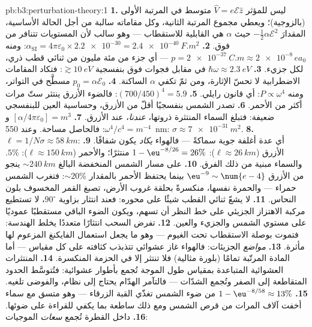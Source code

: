 \begin{solution}{pb:b3:perturbation-theory:1}
\textbf{1.} ليس للمؤثر $\hat V = e\mathcal E\hat z$ متوسط في المرتبة الأولى
(بالزوجية)؛ ويعطي مجموع المرتبة الثانية، وكل مقاماته سالبة من أجل
الحالة الأساسية، المقدارَ $-\tfrac12\alpha\mathcal E^2$ حيث $\alpha$ هي
القابلية للاستقطاب --- وهو سالب لأن المستويات تتنافر من فوق.
\textbf{2.} $\alpha_{\text{SI}} = 4\pi\varepsilon_0 \times
\num{2.2e-30} = \qty{2.4e-40}{F.m^2}$: ومنه $p = \qty{2e-37}{C.m}
\approx \num{2e-8}\,ea_0$ --- أي جزء من مئة مليون من ثنائي قطب
ذري، لكل جزيء.
\textbf{3.} $\hbar\omega \approx \qty{2.3}{eV}$ في مقابل فجوات
فوق بنفسجية $\gtrsim\qty{10}{eV}$: فتكاد المقامات الاضطرابية
لا تحسّ الإثارة، ومن ثمّ تكفي $\alpha$ الساكنة.
\textbf{4.} $p_0 = \alpha\mathcal E_0$ مسطَّح في التواتر، ومنه $P
\propto \omega^4$: أي قانون رايلي.
\textbf{5.} $(700/450)^4 = 5.9$: فالضوء الأزرق ينتثر ستّ مرات
أكثر من الأحمر.
\textbf{6.} تصدر الشمس بنفسجيًا أقلّ من الأزرق، وحساسية العين
للبنفسجي ضعيفة: فتبلغ السماء المنتثرة ذروتها، \emph{عندنا}،
عند الأزرق.
\textbf{7.} $[\alpha/4\pi\varepsilon_0] = \unit{m^3}$ و
$\omega^4/c^4 = \unit{m^{-4}}$: فالحاصل مساحة. وعند \qty{550}{nm}:
$\sigma \approx \qty{7e-31}{m^2}$.
\textbf{8.} $\ell = 1/N\sigma \approx \qty{58}{km}$: أي عدة
أغلفة جوية سماكةً --- فالهواء \emph{يكاد} يكون شفافًا.
\textbf{9.} الأزرق ($\ell \approx \qty{26}{km}$): $1 -
\eu^{-8/26} = 26\%$ منتثرًا؛ والأحمر ($\ell \approx \qty{150}{km}$):
$5\%$. والسماء مبنية من ذلك الفرق.
\textbf{10.} على مسار الشمس المنخفضة البالغ $\sim\qty{240}{km}$ ينجو
من الأزرق $\eu^{-9} \sim \num{e-4}$ بينما يحتفظ الأحمر بالمقدار $\sim20\%$: فتغرب
الشمس حمراء --- والحمرة نفسها، منكسرةً بحلقة غروب الأرض،
تصبغ القمر المخسوف بلون النحاس.
\textbf{11.} لا يشعّ ثنائي القطب شيئًا على محوره: فعند
انتثار بزاوية $90^\circ$، لا تستطيع مركبة الاهتزاز الجزيئي
على خط النظر أن تسهم، ويكون الضوء الباقي
مستقطبًا عموديًا على مستوي الشمس والجزيء والعين.
\textbf{12.} تفرض السحب انتثارًا متعددًا يخلط
الهندسة: فتموت بوصلة الاستقطاب تحت الغيوم ---
وهو ما يجعل استعمال الفايكنغ المزعوم لها مأثرة.
\textbf{13.} \emph{مواضع} الجزيئات: فالهواء غاز
عشوائي تتذبذب كثافته على كل مقياس --- أما المادة المرتّبة
تمامًا (بلورة مثالية) فلا تنتثر إلا في الحزمة
المنكسرة.
\textbf{14.} المنتثرات العشوائية المتباعدة بمقياس طول الموجة تُجمع
بأطوار عشوائية: فتُتوسَّط الحدود المتقاطعة إلى الصفر وتُجمع الشدّات
--- فالتآمر الهدّام يحتاج إلى نظام، والفوضى تلغيه.
\textbf{15.} $1 - \eu^{-8/58} \approx 13\%$ من ضوء الشمس تغذّي
القبة الزرقاء --- وهو متسق مع سماء أخفت آلاف المرات
من قرص الشمس ومع ذلك ساطعة بما يكفي للقراءة على ضوئها.
\textbf{16.} داخل القطرة تُجمع \emph{سعات} الموجيات:

\end{solution}
